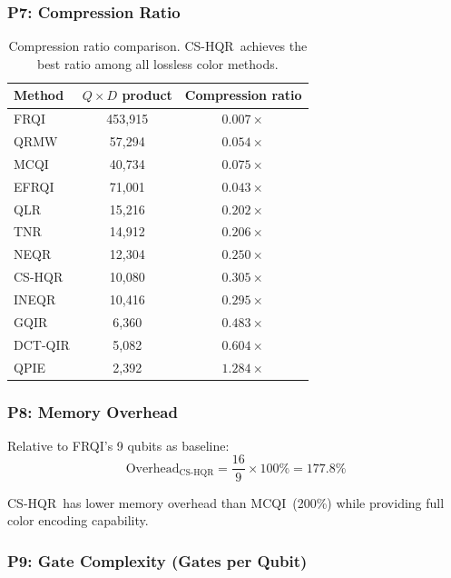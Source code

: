 \documentclass{ipol}
\newcommand{\cshqr}{\textsc{CS-HQR}}
\newcommand{\frqi}{\textsc{FRQI}}
\newcommand{\neqr}{\textsc{NEQR}}
\newcommand{\gqir}{\textsc{GQIR}}
\newcommand{\mcqi}{\textsc{MCQI}}
\begin{document}
\FloatBarrier
\subsubsection{P7: Compression Ratio}

\begin{table}[H]
\begin{center}
\begin{tabular}{lcc}
\hline
Method & $Q \times D$ product & Compression ratio \\
\hline
FRQI & 453,915 & $0.007\times$ \\
QRMW & 57,294 & $0.054\times$ \\
MCQI & 40,734 & $0.075\times$ \\
EFRQI & 71,001 & $0.043\times$ \\
QLR & 15,216 & $0.202\times$ \\
TNR & 14,912 & $0.206\times$ \\
\neqr & 12,304 & $0.250\times$ \\
\rowcolor{green!15}
\cshqr & 10,080 & $\mathbf{0.305}\times$ \\
INEQR & 10,416 & $0.295\times$ \\
\gqir & 6,360 & $0.483\times$ \\
DCT-QIR & 5,082 & $0.604\times$ \\
QPIE & 2,392 & $1.284\times$ \\
\hline
\end{tabular}
\caption{Compression ratio comparison. \cshqr\ achieves the best ratio
  among all lossless color methods.}
\label{tab:compression}
\end{center}
\end{table}

\FloatBarrier
\subsubsection{P8: Memory Overhead}

Relative to \frqi's 9 qubits as baseline:
$$\text{Overhead}_{\text{CS-HQR}} = \frac{16}{9} \times 100\% = 177.8\%$$

\cshqr\ has lower memory overhead than \mcqi\ (200\%) while providing full
color encoding capability.

\FloatBarrier
\subsubsection{P9: Gate Complexity (Gates per Qubit)}
\end{document}
